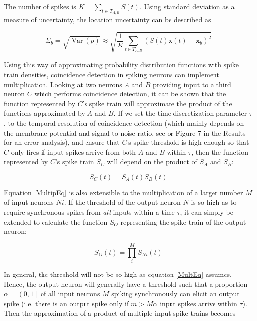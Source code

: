 The number of spikes is $K=\sum_{t \in T_{A,B}}{S(t)}$. Using standard deviation as a measure of uncertainty, the location uncertainty can be described as

\begin{equation}\label{BgUnc}
\Sigma_b = \sqrt{\operatorname{Var}(p)} \approx \sqrt{\frac{1}{K} \sum_{t \in T_{A,B}} {(S(t) \boldsymbol x(t) - \boldsymbol x_b)^2} }
\end{equation}

Using this way of approximating probability distribution functions with spike train densities, coincidence detection in spiking neurons can implement multiplication. Looking at two neurons $A$ and $B$ providing input to a third neuron $C$ which performs coincidence detection, it can be shown that the function represented by $C$'s spike train will approximate the product of the functions approximated by $A$ and $B$. If we set the time discretization parameter $\tau$, to the temporal resolution of coincidence detection (which mainly depends on the membrane potential and signal-to-noise ratio, see \citep{Brette2012} or Figure 7 in the Results for an error analysis), and ensure that $C$'s spike threshold is high enough so that $C$ only fires if input spikes arrive from both $A$ and $B$ within $ \tau $, then the function represented by $C$'s spike train $ S_{C} $ will depend on the product of $ S_{A} $ and $ S_{B} $:

\begin{equation}\label{MultipEq}
S_{C}(t) = S_{A}(t) S_{B}(t)
\end{equation} 

Equation \eqref{MultipEq} is also extensible to the multiplication of a larger number $ M $ of input neurons $ Ni $. If the threshold of the output neuron $ N $ is so high as to require synchronous spikes from \textit{all} inputs within a time $ \tau $, it can simply be extended to calculate the function $ S_{O} $ representing the spike train of the output neuron:

\begin{equation}\label{MultEq}
S_{O}(t) = \prod_i^M S_{Ni}(t)
\end{equation} 

In general, the threshold will not be so high as equation \eqref{MultEq} assumes. Hence, the output neuron will generally have a threshold such that a proportion $ \alpha=\left( 0, 1 \right] $ of all input neurons $ M $ spiking synchronously can elicit an output spike (i.e. there is an output spike only if $ m > M \alpha $ input spikes arrive within $ \tau $). Then the approximation of a product of multiple input spike trains becomes

